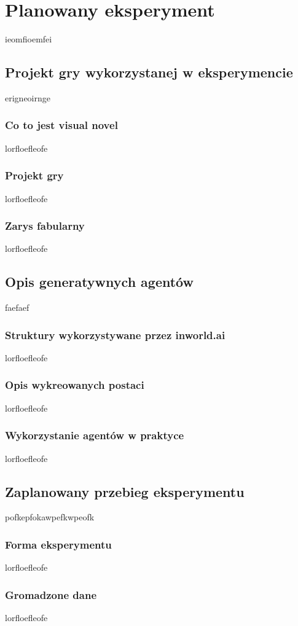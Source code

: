 \graphicspath{{chapters/chapter4/imgs/}}

\chapter{Planowany eksperyment}\label{chapter:ch4}

ieomfioemfei

\section{Projekt gry wykorzystanej w eksperymencie}\label{section:ch4_1}

erigneoirnge

\subsection*{Co to jest visual novel}

lorfloefleofe

\subsection*{Projekt gry}

lorfloefleofe

\subsection*{Zarys fabularny}

lorfloefleofe

\section{Opis generatywnych agentów}\label{section:ch4_2}

faefaef

\subsection*{Struktury wykorzystywane przez inworld.ai}

lorfloefleofe

\subsection*{Opis wykreowanych postaci}

lorfloefleofe

\subsection*{Wykorzystanie agentów w praktyce}

lorfloefleofe

\section{Zaplanowany przebieg eksperymentu}\label{section:ch4_3}

pofkepfokawpefkwpeofk

\subsection*{Forma eksperymentu}

lorfloefleofe

\subsection*{Gromadzone dane}

lorfloefleofe